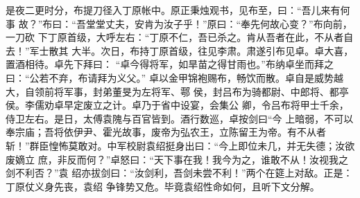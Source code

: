 是夜二更时分，布提刀径入丁原帐中。原正秉烛观书，见布至，曰：“吾儿来有何事
故？”布曰：“吾堂堂丈夫，安肯为汝子乎！”原曰：“奉先何故心变？”布向前，一刀砍
下丁原首级，大呼左右：“丁原不仁，吾已杀之。肯从吾者在此，不从者自去！”军士散其
大半。次日，布持丁原首级，往见李肃。肃遂引布见卓。卓大喜，置酒相待。卓先下拜曰：
“卓今得将军，如旱苗之得甘雨也。”布纳卓坐而拜之曰：“公若不弃，布请拜为义父。”
卓以金甲锦袍赐布，畅饮而散。卓自是威势越大，自领前将军事，封弟董旻为左将军、鄠
侯，封吕布为骑都尉、中郎将、都亭侯。李儒劝卓早定废立之计。卓乃于省中设宴，会集公
卿，令吕布将甲士千余，侍卫左右。是日，太傅袁隗与百官皆到。酒行数巡，卓按剑曰“今
上暗弱，不可以奉宗庙；吾将依伊尹、霍光故事，废帝为弘农王，立陈留王为帝。有不从者
斩！”群臣惶怖莫敢对。中军校尉袁绍挺身出曰：“今上即位未几，并无失德；汝欲废嫡立
庶，非反而何？”卓怒曰：“天下事在我！我今为之，谁敢不从！汝视我之剑不利否？”袁
绍亦拔剑曰：“汝剑利，吾剑未尝不利！”两个在筵上对敌。正是：丁原仗义身先丧，袁绍
争锋势又危。毕竟袁绍性命如何，且听下文分解。